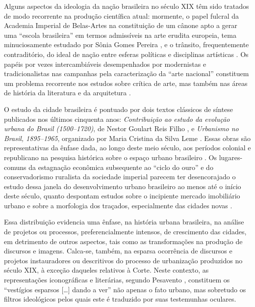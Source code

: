 Alguns aspectos da ideologia da nação brasileira no século XIX têm sido
tratados de modo recorrente na produção científica atual: mormente, o
papel fulcral da Academia Imperial de Belas-Artes na constituição de um
cânone apto a gerar uma ``escola brasileira'' em termos admissíveis na
arte erudita europeia, tema minuciosamente estudado por Sônia Gomes
Pereira \autocite{pereira:2012revisao}, e o trânsito, frequentemente
contraditório, do ideal de nação entre esferas políticas e disciplinas
artísticas \autocite{abreu:2001museu}. Os papéis por vezes
intercambiáveis desempenhados por modernistas e tradicionalistas nas
campanhas pela caracterização da ``arte nacional'' constituem um
problema recorrente nos estudos sobre crítica de arte, mas também nas
áreas de história da literatura e da arquitetura
\autocite{lins:1996gonzaga25,thiengo:2010questao,wisnik:2007plastica}.

O estudo da cidade brasileira é pontuado por dois textos clássicos de
síntese publicados nos últimos cinquenta anos: \emph{Contribuição ao
estudo da evolução urbana do Brasil (1500--1720)}, de Nestor Goulart
Reis Filho \autocite*{reisfilho:1968contribuicao}, e \emph{Urbanismo no
Brasil, 1895--1965}, organizado por Maria Cristina da Silva Leme
\autocite*{leme:2005urbanismo}. Essas obras são representativas da
ênfase dada, ao longo deste meio século, aos períodos colonial e
republicano na pesquisa histórica sobre o espaço urbano brasileiro
\autocite{fernandes:2004historia}. Os lugares-comuns da estagnação
econômica subsequente ao ``ciclo do ouro'' e do conservadorismo
ruralista da sociedade imperial parecem ter desencorajado o estudo dessa
janela do desenvolvimento urbano brasileiro ao menos até o início deste
século, quanto despontam estudos sobre o incipiente mercado imobiliário
urbano \autocite{bueno:2005tecido} e sobre a morfologia dos traçados,
especialmente das cidades novas
\autocite{brazesilva:2012planejamento13,nogueira:2013analise}.

Essa distribuição evidencia uma ênfase, na história urbana brasileira,
na análise de projetos ou processos, preferencialmente intensos, de
crescimento das cidades, em detrimento de outros aspectos, tais como as
transformações na produção de discursos e imagens. Calca-se, também, na
esparsa ocorrência de discursos e projetos instauradores ou descritivos
do processo de urbanização produzidos no século XIX, à exceção daqueles
relativos à Corte. Neste contexto, as representações iconográficas e
literárias, segundo Pesavento \autocite*[ p.~665]{pesavento:2001busca},
constituem os ``vestígios esparsos {[}\ldots{]} dando a ver'' não apenas
o fato urbano, mas sobretudo os filtros ideológicos pelos quais este é
traduzido por suas testemunhas oculares.

